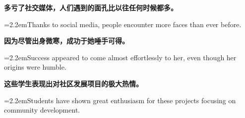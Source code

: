 \documentclass[11pt,a4paper]{article}
\newcommand{\num}[1]{\makebox[1.9em][r]{#1.}\hspace{0.3em}}
\begin{document}
\num{5}\textbf{多亏了社交媒体，人们遇到的面孔比以往任何时候都多。}

\vspace{0.15em}

\noindent\hangindent=2.2em\hspace{2.2em}Thanks to social media, people encounter more faces than ever before.

\num{6}\textbf{因为尽管出身微寒，成功于她唾手可得。}

\vspace{0.15em}

\noindent\hangindent=2.2em\hspace{2.2em}Success appeared to come almost effortlessly to her, even though her origins were humble.

\num{7}\textbf{这些学生表现出对社区发展项目的极大热情。}

\vspace{0.15em}

\noindent\hangindent=2.2em\hspace{2.2em}Students have shown great enthusiasm for these projects focusing on community development.
\end{document}
